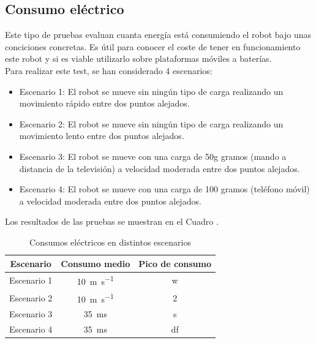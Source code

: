 \subsection{Consumo eléctrico} 
\noindent Este tipo de pruebas evaluan cuanta energía está consumiendo el robot bajo unas conciciones concretas. Es útil para 
conocer el coste de tener en funcionamiento este robot y si es viable utilizarlo sobre plataformas móviles a baterías. 
\\
Para realizar este test, se han considerado 4 escenarios:
\begin{itemize}
\item Escenario 1: El robot se mueve sin ningún tipo de carga realizando un movimiento rápido entre dos puntos alejados.
\item Escenario 2: El robot se mueve sin ningún tipo de carga realizando un movimiento lento entre dos puntos alejados.
\item Escenario 3: El robot se mueve con una carga de 50g gramos (mando a distancia de la televisión) a velocidad moderada entre dos puntos alejados.
\item Escenario 4: El robot se mueve con una carga de 100 gramos (teléfono móvil) a velocidad moderada entre dos puntos alejados.

\end{itemize}
Los resultados de las pruebas se muestran en el Cuadro \label{cuadro:consumos}.
\begin{table}[H]
\begin{center}
\begin{tabular}{|c|c|c|}
\hline
\textbf{Escenario} & \textbf{Consumo medio} & \textbf{Pico de consumo}\\
\hline
Escenario 1 & \SI{10}{\meter\per\second} & w\\
Escenario 2 & \SI{10}{\meter\per\second} & 2\\
Escenario 3 & \SI{35}{\milli\second} & s \\
Escenario 4 & \SI{35}{\milli\second} & df\\
\hline
\end{tabular}
\caption{Consumos eléctricos en distintos escenarios}
\label{cuadro:consumos}
\end{center}
\end{table}